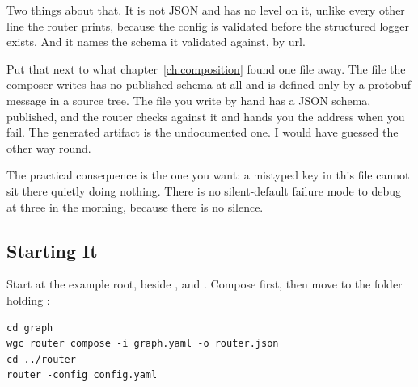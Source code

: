 %
Two things about that. It is not JSON and has no level on it, unlike every
other line the router prints, because the config is validated before the
structured logger exists. And it names the schema it validated against, by url.

%
Put that next to what chapter~\ref{ch:composition} found one file away. The
file the composer writes has no published schema at all and is defined only by
a protobuf message in a source tree. The file you write by hand has a
JSON schema, published, and the router checks against it and hands you the
address when you fail. The generated artifact is the undocumented one. I would
have guessed the other way round.

%
The practical consequence is the one you want: a mistyped key in this file
cannot sit there quietly doing nothing. There is no silent-default failure mode
to debug at three in the morning, because there is no silence.

\subsection{Starting It}

%
Start at the example root, beside ,  and
. Compose first, then move to the folder holding
:

\begin{verbatim}
cd graph
wgc router compose -i graph.yaml -o router.json
cd ../router
router -config config.yaml
\end{verbatim}

